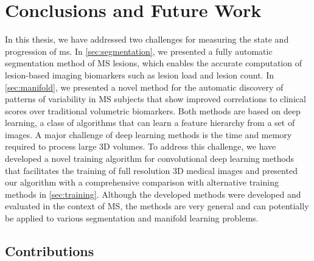 \chapter{Conclusions and Future Work}
\label{sec:conclusions}

In this thesis, we have addressed two challenges for measuring the state and
progression of \gls{ms}. In \ref{sec:segmentation}, we presented a fully
automatic segmentation method of MS lesions, which enables the accurate
computation of lesion-based imaging biomarkers such as lesion load and lesion
count. In \ref{sec:manifold}, we presented a novel method for the automatic
discovery of patterns of variability in MS subjects that show improved
correlations to clinical scores over traditional volumetric biomarkers. Both
methods are based on deep learning, a class of algorithms that can learn a
feature hierarchy from a set of images. A major challenge of deep learning
methods is the time and memory required to process large 3D volumes. To address
this challenge, we have developed a novel training algorithm for convolutional
deep learning methods that facilitates the training of full resolution 3D
medical images and presented our algorithm with a comprehensive comparison with
alternative training methods in \ref{sec:training}. Although the developed
methods were developed and evaluated in the context of MS, the methods are very
general and can potentially be applied to various segmentation and manifold
learning problems.

\section{Contributions}

